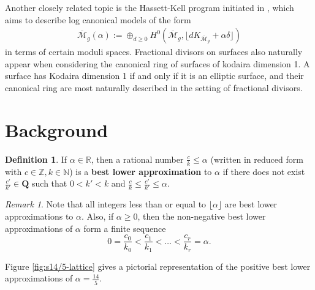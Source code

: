 \documentclass{amsart}
\theoremstyle{plain}
\theoremstyle{definition}
\newtheorem{defn}[thm]{Definition}
\theoremstyle{remark}
\newtheorem{rem}[thm]{Remark}
\numberwithin{equation}{section}
\newcommand\bn{{\mathbb N}}
\newcommand\br{{\mathbb R}}
\newcommand\bz{{\mathbb Z}}
\begin{document}
Another closely related topic is the Hassett-Kell program 
initiated in  \cite{hassett:classical-and-minimal-models}, which aims to describe log canonical models of the form
\begin{align*}
	\overline {\mathscr M}_g(\alpha) := \oplus_{d \geq 0}H^0 \left( \overline {\mathscr M}_g, \lfloor d K_{\overline{\mathscr M}_g} + \alpha\delta \rfloor  \right) 
\end{align*}
in terms of certain moduli spaces. Fractional divisors on surfaces also naturally appear when considering the canonical ring of surfaces of kodaira dimension 1. A surface has Kodaira dimension 1 if and only if it is an elliptic surface, and their canonical ring are most naturally described in the setting of fractional divisors. 

\section{Background}

\begin{defn}
\label{defn:lower-approximation}
If $\alpha \in \br$, then a rational number $\frac{c}{k} \leq \alpha
$ (written in reduced form with $c \in \bz, k \in \bn$) is a
\textbf{best lower approximation} to $\alpha$ if there does not
exist $\frac{c'}{k'}\in \mathbf{Q}$ such that $0 < k'< k$ and
$\frac{c}{k} \le \frac{c'}{k'} \le \alpha$. 
\end{defn}

\begin{rem}
\label{rem:lower-approximation}
Note that all integers less than or equal to $\lfloor \alpha \rfloor$
are best lower approximations to $\alpha$. Also, if $\alpha \ge 0$,
then the non-negative best lower approximations of
$\alpha$ form a finite sequence
\[
	0 = \frac{c_0}{k_0} < \frac{c_1}{k_1} < \ldots < \frac{c_r}{k_r} = \alpha.
\]

\noindent
Figure \ref{fig:s14/5-lattice} gives a pictorial representation of the positive best lower approximations of $\alpha = \frac{14}{5}$.
\end{rem}
\end{document}
